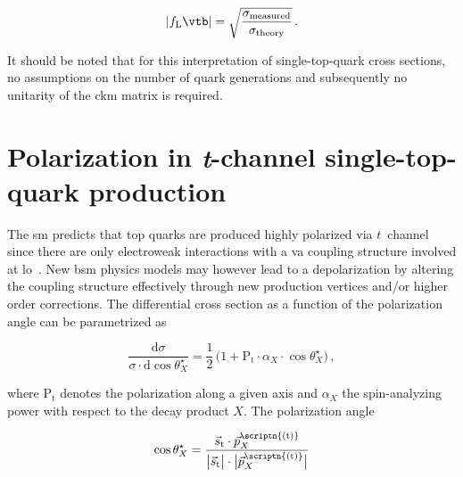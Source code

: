 \begin{equation}
|f_\mathrm{L}\vtb|=\sqrt{\frac{\sigma_\mathrm{measured}}{\sigma_\mathrm{theory}}}\,.
\end{equation}

It should be noted that for this interpretation of single-top-quark cross sections, no assumptions on the number of quark generations and subsequently no unitarity of the \gls{ckm} matrix is required.



\section{Polarization in \textit{t}-channel single-top-quark production}
\label{sec:theory-t-channel-polarization}

The \gls{sm} predicts that top quarks are produced highly polarized via $t$~channel since there are only electroweak interactions with a \gls{va} coupling structure involved at \gls{lo}~\cite{Bernreuther:2008ju}. New \gls{bsm} physics models may however lead to a depolarization by altering the coupling structure effectively through new production vertices and/or higher order corrections. The differential cross section as a function of the polarization angle can be parametrized as

\begin{equation}
\frac{\mathrm{d}\sigma}{\sigma\cdot\mathrm{d}\cos\theta^\star_{X}}=\frac{1}{2}\,\Big(1+\mathrm{P}_\mathrm{t}\cdot\alpha_{X}\cdot\cos\theta^\star_{X}\Big)\,,
\end{equation}

where $\mathrm{P}_\mathrm{t}$ denotes the polarization along a given axis and $\alpha_{X}$ the spin-analyzing power with respect to the decay product $X$. The polarization angle

\begin{equation}
\cos\theta^\star_{X}=\frac{\vec{s}_\mathrm{t}\cdot \vec{p}_{X}^\scriptn{\mathrm{(t)}}}{\big|\vec{s}_\mathrm{t}\big|\cdot\big|\vec{p}_{X}^\scriptn{\mathrm{(t)}}\big|}
\end{equation}

